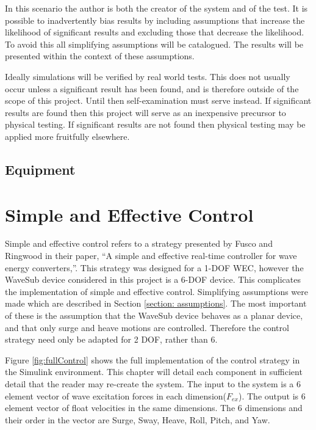 \documentclass{report}
\begin{document}
In this scenario the author is both the creator of the system and of the test. It is possible to inadvertently bias results by including assumptions that increase the likelihood of significant results and excluding those that decrease the likelihood. To avoid this all simplifying assumptions will be catalogued. The results will be presented within the context of these assumptions.

Ideally simulations will be verified by real world tests. This does not usually occur unless a significant result has been found, and is therefore outside of the scope of this project. Until then self-examination must serve instead. If significant results are found then this project will serve as an inexpensive precursor to physical testing. If significant results are not found then physical testing may be applied more fruitfully elsewhere.

\section{Equipment}

\chapter{Simple and Effective Control}
Simple and effective control refers to a strategy presented by Fusco and Ringwood in their paper, ``A simple and effective real-time controller for wave energy converters,''\cite{ringwood}. This strategy was designed for a 1-DOF WEC, however the WaveSub device considered in this project is a 6-DOF device. This complicates the implementation of simple and effective control. Simplifying assumptions were made which are described in Section \ref{section: assumptions}. The most important of these is the assumption that the WaveSub device behaves as a planar device, and that only surge and heave motions are controlled. Therefore the control strategy need only be adapted for 2 DOF, rather than 6.

Figure \ref{fig:fullControl} shows the full implementation of the control strategy in the Simulink environment. This chapter will detail each component in sufficient detail that the reader may re-create the system. The input to the system is a 6 element vector of wave excitation forces in each dimension($F_{ex}$). The output is 6 element vector of float velocities in the same dimensions. The 6 dimensions and their order in the vector are Surge, Sway, Heave, Roll, Pitch, and Yaw.
\end{document}
